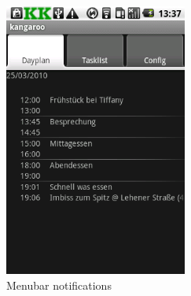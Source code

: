 \begin{figure}[h!]
    \centering
    \includegraphics[width=6cm]{pics/gui/menubar_notification.png}
    \caption{Menubar notifications}
    \label{img:menubar_notification}
\end{figure}
